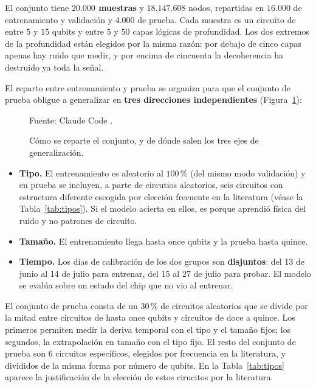 El conjunto tiene \textbf{$20{.}000$ muestras} y $18{.}147{.}608$ nodos, repartidas en
$16{.}000$ de entrenamiento y validación y $4{.}000$ de prueba. Cada muestra es un circuito de
entre $5$ y $15$ qubits y entre $5$ y $50$ capas lógicas de profundidad. Los dos extremos de la
profundidad están elegidos por la misma razón: por debajo de cinco capas apenas hay ruido que
medir, y por encima de cincuenta la decoherencia ha destruido ya toda la señal.


El reparto entre entrenamiento y prueba se organiza para que el conjunto de prueba obligue a generalizar en \textbf{tres
direcciones independientes} (Figura~\ref{fig:tres_ejes}):

\begin{figure}[htbp]
    \centering
    \caption{Cómo se reparte el conjunto, y de dónde salen los tres ejes de generalización.}
    \label{fig:tres_ejes}

    

    {\footnotesize Fuente: Claude Code \cite{anthropic_claude}.}
\end{figure}

\begin{itemize}
    \item \textbf{Tipo.} El entrenamiento es aleatorio al $100$\,\% (del mismo modo validación) y en prueba se incluyen, a parte de circutios aleatorios, seis circuitos con estructura diferente escogida por elección frecuente en la literatura (véase la Tabla~\ref{tab:tipos}). Si el modelo acierta en ellos, es porque aprendió física del ruido y no patrones de circuito.
    \item \textbf{Tamaño.} El entrenamiento llega hasta once qubits y la prueba hasta quince.
    \item \textbf{Tiempo.} Los días de calibración de los dos grupos son \textbf{disjuntos}: del 13 de junio al 14 de julio para entrenar, del 15 al 27 de julio para probar. El modelo se evalúa sobre un estado del chip que no vio al entrenar.
\end{itemize}

El conjunto de prueba consta de un $30$\,\% de
circuitos aleatorios que se divide por la mitad
entre circuitos de hasta once qubits y circuitos de doce a quince. Los primeros permiten medir la deriva temporal con el tipo y el tamaño fijos; los segundos, la extrapolación en
tamaño con el tipo fijo. El resto del conjunto de prueba son 6 circuitos específicos, elegidos por frecuencia en la literatura, y divididos de la misma forma por número de qubits. En la Tabla~\ref{tab:tipos} aparece la justificación de la elección de estos cirucitos por la literatura.


